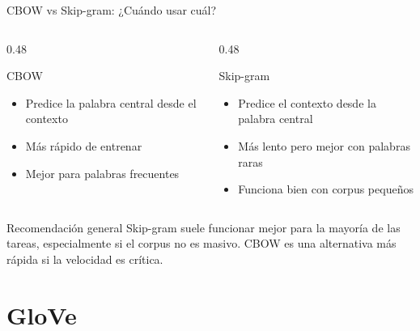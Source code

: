 \documentclass[handout]{beamer}
\begin{document}
\begin{frame}{CBOW vs Skip-gram: ¿Cuándo usar cuál?}
  \begin{columns}[T] %
    \begin{column}{0.48\textwidth}
      \begin{block}{CBOW}
        \begin{itemize}
          \item Predice la palabra central desde el contexto
          \item Más rápido de entrenar
          \item Mejor para palabras frecuentes
        \end{itemize}
      \end{block}
    \end{column}
    \begin{column}{0.48\textwidth}
      \begin{block}{Skip-gram}
        \begin{itemize}
          \item Predice el contexto desde la palabra central
          \item Más lento pero mejor con palabras raras
          \item Funciona bien con corpus pequeños
        \end{itemize}
      \end{block}
    \end{column}
  \end{columns}
  \begin{alertblock}{Recomendación general}
    Skip-gram suele funcionar mejor para la mayoría de las tareas, especialmente si el corpus no es masivo. CBOW es una alternativa más rápida si la velocidad es crítica.
  \end{alertblock}
\end{frame}

\section{GloVe}
\end{document}
